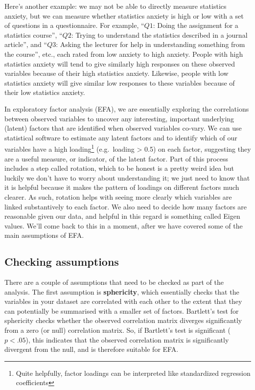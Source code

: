 \documentclass[
  a4paper,
]{book}
\begin{document}
Here's another example: we may not be able to directly measure
statistics anxiety, but we can measure whether statistics anxiety is
high or low with a set of questions in a questionnaire. For example,
``\(Q1\): Doing the assignment for a statistics course'', ``\(Q2\):
Trying to understand the statistics described in a journal article'',
and ``\(Q3\): Asking the lecturer for help in understanding something
from the course'', etc., each rated from low anxiety to high anxiety.
People with high statistics anxiety will tend to give similarly high
responses on these observed variables because of their high statistics
anxiety. Likewise, people with low statistics anxiety will give similar
low responses to these variables because of their low statistics
anxiety.

In exploratory factor analysis (EFA), we are essentially exploring the
correlations between observed variables to uncover any interesting,
important underlying (latent) factors that are identified when observed
variables co-vary. We can use statistical software to estimate any
latent factors and to identify which of our variables have a high
loading\footnote{Quite helpfully, factor loadings can be interpreted
  like standardized regression coefficients} (e.g.~loading
\textgreater{} 0.5) on each factor, suggesting they are a useful
measure, or indicator, of the latent factor. Part of this process
includes a step called rotation, which to be honest is a pretty weird
idea but luckily we don't have to worry about understanding it; we just
need to know that it is helpful because it makes the pattern of loadings
on different factors much clearer. As such, rotation helps with seeing
more clearly which variables are linked substantively to each factor. We
also need to decide how many factors are reasonable given our data, and
helpful in this regard is something called Eigen values. We'll come back
to this in a moment, after we have covered some of the main assumptions
of EFA.

\hypertarget{checking-assumptions}{%
\subsection{Checking assumptions}\label{checking-assumptions}}

There are a couple of assumptions that need to be checked as part of the
analysis. The first assumption is \textbf{sphericity}, which essentially
checks that the variables in your dataset are correlated with each other
to the extent that they can potentially be summarised with a smaller set
of factors. Bartlett's test for sphericity checks whether the observed
correlation matrix diverges significantly from a zero (or null)
correlation matrix. So, if Bartlett's test is significant (\(p < .05\)),
this indicates that the observed correlation matrix is significantly
divergent from the null, and is therefore suitable for EFA.
\end{document}
